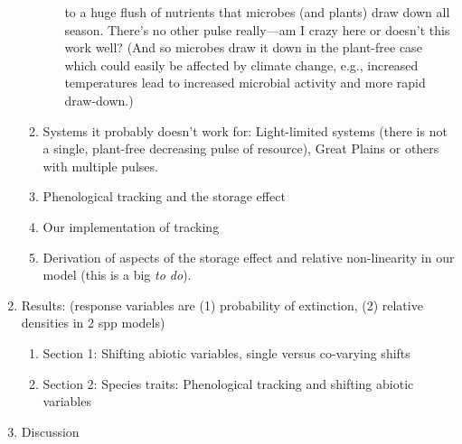 \documentclass[11pt,a4paper,oneside]{article}
\begin{document}
\begin{enumerate}
\begin{enumerate}
\begin{enumerate}
  to a huge flush of nutrients \citep{Zak:1990ar} that microbes (and plants) draw down
  all season. There's no other pulse really---am I crazy here or
  doesn't this work well? (And so microbes draw it down in the
  plant-free case which could easily be affected by climate change,
  e.g., increased temperatures lead to increased microbial activity
  and more rapid draw-down.)
\end{enumerate}
\item Systems it probably doesn't work for: Light-limited systems
  (there is not a single, plant-free decreasing pulse of resource),
  Great Plains or others with multiple pulses.
\item Phenological tracking and the storage effect
\item Our implementation of tracking
\item Derivation of aspects of the storage effect and relative
  non-linearity in our model (this is a big \emph{to do}).
\end{enumerate}
\item Results: (response variables are (1) probability of extinction,
  (2) relative
  densities in 2 spp models)
\begin{enumerate}
\item Section 1: Shifting abiotic variables, single versus co-varying
  shifts 
\item Section 2: Species traits: Phenological tracking and shifting
  abiotic variables
\end{enumerate}
\item Discussion
\end{enumerate}
\end{document}
